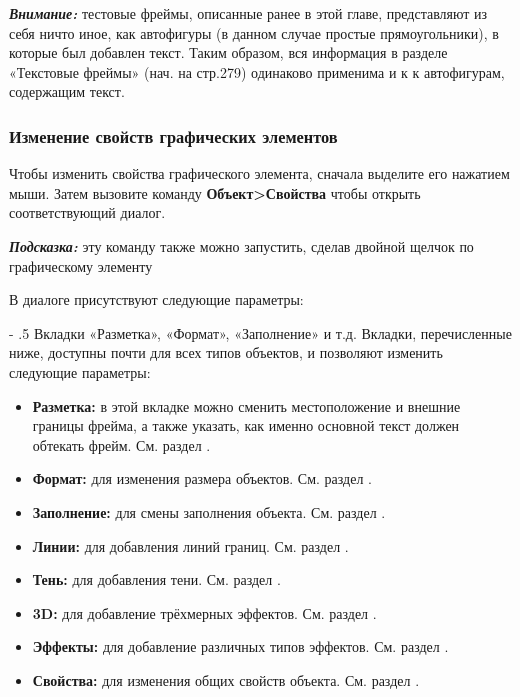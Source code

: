 ﻿\documentclass[a4paper,10pt]{article}
\makeatletter
\renewcommand\paragraph{%
   \@startsection{paragraph}{4}{0mm}%
      {-\baselineskip}%
      {.5\baselineskip}%
      {\normalfont\normalsize\bfseries}}
\makeatother
\begin{document}
\begin{mdframed}[backgroundcolor=blue!10]
\textbf{\textit{Внимание:}} тестовые фреймы, описанные ранее в этой главе, представляют из себя ничто иное, как автофигуры (в данном случае простые прямоугольники), в которые был добавлен текст. Таким образом, вся информация в разделе «Текстовые фреймы» (нач. на стр.279) одинаково применима и к к автофигурам, содержащим текст.
\end{mdframed}

\subsubsection{Изменение свойств графических элементов}
Чтобы изменить свойства графического элемента, сначала выделите его нажатием мыши. Затем вызовите команду \textbf{Объект>Свойства} чтобы открыть соответствующий диалог.

\begin{mdframed}[backgroundcolor=blue!10]
\textbf{\textit{Подсказка:}} эту команду также можно запустить, сделав двойной щелчок по графическому элементу
\end{mdframed}

В диалоге присутствуют следующие параметры:

\paragraph{Вкладки «Разметка», «Формат», «Заполнение» и т.д.}
Вкладки, перечисленные ниже, доступны почти для всех типов объектов, и позволяют изменить следующие
параметры:

\begin{itemize}
 \item \textbf{Разметка:} в этой вкладке можно сменить местоположение и внешние границы фрейма, а также указать, как именно основной текст должен обтекать фрейм. См. раздел .
 \item \textbf{Формат:} для изменения размера объектов. См. раздел .
 \item \textbf{Заполнение:} для смены заполнения объекта. См. раздел .
 \item \textbf{Линии:} для добавления линий границ. См. раздел .
 \item \textbf{Тень:} для добавления тени. См. раздел .
 \item \textbf{3D:} для добавление трёхмерных эффектов. См. раздел .
 \item \textbf{Эффекты:} для добавление различных типов эффектов. См. раздел .
 \item \textbf{Свойства:} для изменения общих свойств объекта. См. раздел .
\end{itemize} 
\end{document}
